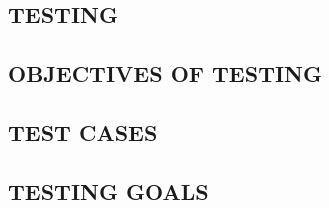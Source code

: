 \begin{center}
	\chapter{TESTING}
\end{center}
\section{OBJECTIVES OF TESTING}
\section{TEST CASES}
\section{TESTING GOALS}